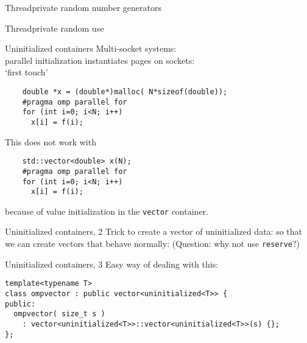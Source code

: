 
\begin{numberedframe}{Threadprivate random number generators}
  
\end{numberedframe}

\begin{numberedframe}{Threadprivate random use}
  
\end{numberedframe}

\begin{numberedframe}{Uninitialized containers}
  Multi-socket systems:\\
  parallel initialization instantiates pages on sockets:\\
  `first touch'
  \begin{lstlisting}
    double *x = (double*)malloc( N*sizeof(double));
    #pragma omp parallel for
    for (int i=0; i<N; i++)
      x[i] = f(i);
  \end{lstlisting}
  This does not work with
  \begin{lstlisting}
    std::vector<double> x(N);
    #pragma omp parallel for
    for (int i=0; i<N; i++)
      x[i] = f(i);
  \end{lstlisting}
  because of value initialization in the \lstinline{vector} container.
\end{numberedframe}

\begin{numberedframe}{Uninitialized containers, 2}
  Trick to create a vector of uninitialized data:
  so that we can create vectors that behave normally:
  (Question: why not use \lstinline{reserve}?)
\end{numberedframe}

\begin{numberedframe}{Uninitialized containers, 3}
  Easy way of dealing with this:
\begin{lstlisting}
template<typename T>
class ompvector : public vector<uninitialized<T>> {
public:
  ompvector( size_t s )
    : vector<uninitialized<T>>::vector<uninitialized<T>>(s) {};
};
\end{lstlisting}
\end{numberedframe}

